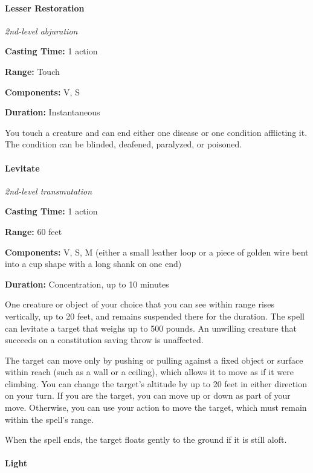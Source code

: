 \documentclass[
]{article}
\begin{document}
\hypertarget{lesser-restoration}{%
\paragraph{Lesser Restoration}\label{lesser-restoration}}

\emph{2nd-level abjuration}

\textbf{Casting Time:} 1 action

\textbf{Range:} Touch

\textbf{Components:} V, S

\textbf{Duration:} Instantaneous

You touch a creature and can end either one disease or one condition
afflicting it. The condition can be blinded, deafened, paralyzed, or
poisoned.

\hypertarget{levitate}{%
\paragraph{Levitate}\label{levitate}}

\emph{2nd-level transmutation}

\textbf{Casting Time:} 1 action

\textbf{Range:} 60 feet

\textbf{Components:} V, S, M (either a small leather loop or a piece of
golden wire bent into a cup shape with a long shank on one end)

\textbf{Duration:} Concentration, up to 10 minutes

One creature or object of your choice that you can see within range
rises vertically, up to 20 feet, and remains suspended there for the
duration. The spell can levitate a target that weighs up to 500 pounds.
An unwilling creature that succeeds on a constitution saving throw is
unaffected.

The target can move only by pushing or pulling against a fixed object or
surface within reach (such as a wall or a ceiling), which allows it to
move as if it were climbing. You can change the target's altitude by up
to 20 feet in either direction on your turn. If you are the target, you
can move up or down as part of your move. Otherwise, you can use your
action to move the target, which must remain within the spell's range.

When the spell ends, the target floats gently to the ground if it is
still aloft.

\hypertarget{light}{%
\paragraph{Light}\label{light}}
\end{document}
